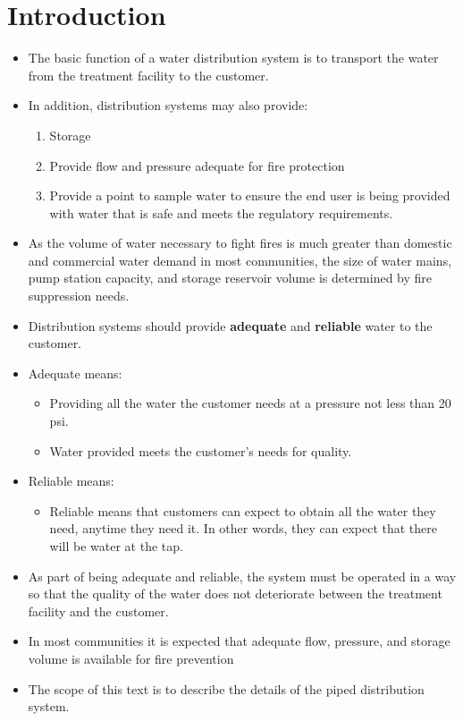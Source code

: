 \section{Introduction}
\begin{itemize}
\item The basic function of a water distribution system is to transport the water from the treatment facility to the customer.
\item In addition, distribution systems may also provide:
\begin{enumerate}
\item Storage 
\item Provide flow and pressure adequate for fire protection
\item Provide a point to sample water to ensure the end user is being provided with water that is safe and meets the regulatory requirements.
\end{enumerate}
\item As the volume of water necessary to fight fires is much greater than domestic and commercial water demand in most communities, the size of water mains, pump station capacity, and storage reservoir volume is determined by fire suppression needs.
\item Distribution systems should provide \textbf{adequate} and \textbf{reliable} water to the customer. 
\item Adequate means:
\begin{itemize}
\item Providing all the water the customer needs at a pressure not less than 20 psi. 
\item Water provided meets the customer's needs for quality.
\end{itemize}
\item Reliable means:
\begin{itemize}
\item Reliable means that customers can expect to obtain all the water they need, anytime they need it. In other words, they can expect that there will be water at the tap. 
\end{itemize}
\item As part of being adequate and reliable, the system must be operated in a way so that the quality of the water does not deteriorate between the treatment facility and the customer.
\item In most communities it is expected that adequate flow, pressure, and storage volume is available for fire prevention
\item The scope of this text is to describe the details of the piped distribution system.

\end{itemize}
